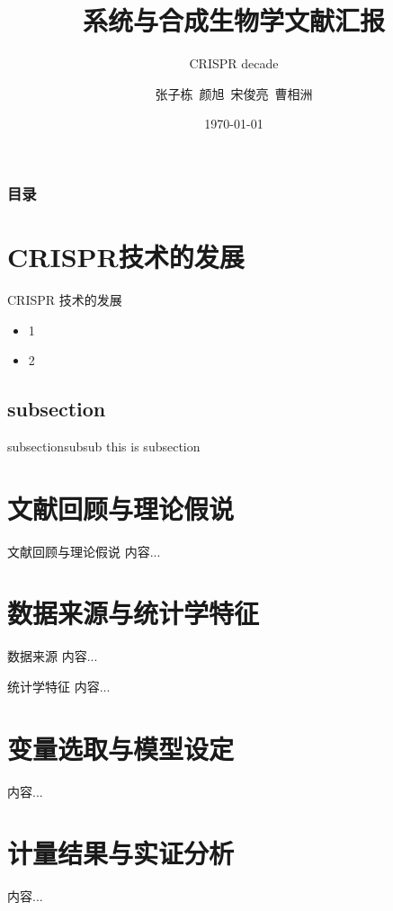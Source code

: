 \documentclass{beamer}
\author[张子栋~颜旭~宋俊亮~曹相洲]{张子栋~颜旭~宋俊亮~曹相洲}
\title[CRISPR decade]{系统与合成生物学文献汇报}
\subtitle{CRISPR decade}
\institute[HZAU]{华中农业大学
	
	信息学院}
\date[\today]{\today}
\begin{document}
	\kaishu
	
	\frame{\titlepage}
	
	\begin{frame}
		\frametitle{目录}
		\tableofcontents
	\end{frame}
	
	\section{CRISPR技术的发展}
	\begin{frame}{CRISPR 技术的发展}
		\begin{itemize}
			\item 1
			\item 2
		\end{itemize}
	\end{frame}

	\subsection{subsection}
	\begin{frame}{subsection}{subsub}
		this is subsection
	\end{frame}

	\section{文献回顾与理论假说}
	\begin{frame}{文献回顾与理论假说}
		内容...
	\end{frame}
	
	\section{数据来源与统计学特征}
	\begin{frame}{数据来源}
		内容...
	\end{frame}
	\begin{frame}{统计学特征}
		内容...
	\end{frame}

	\section{变量选取与模型设定}
	\begin{frame}{}
		内容...
	\end{frame}

	\section{计量结果与实证分析}
	\begin{frame}{}
		内容...
	\end{frame}
\end{document}
